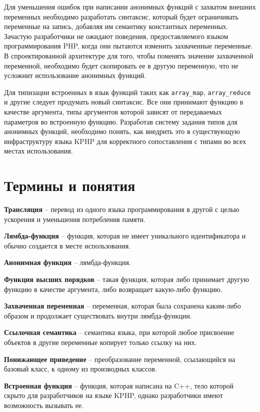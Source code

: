 Для уменьшения ошибок при написании анонимных функций с захватом внешних переменных необходимо разработать синтаксис, который будет ограничивать переменные на запись, добавляя им семантику константных переменных.
Зачастую разработчики не ожидают поведения, предоставляемого языком программирования PHP, когда они пытаются изменить захваченные переменные.
В спроектированной архитектуре для того, чтобы поменять значение захваченной переменной, необходимо будет скопировать ее в другую переменную, что не усложнит использование анонимных функций.

Для типизации встроенных в язык функций таких как \verb|array_map|, \verb|array_reduce| и другие следует продумать новый синтаксис.
Все они принимают функцию в качестве аргумента, типы аргументов которой зависят от передаваемых параметров во встроенную функцию.
Разработав систему задания типов для анонимных функций, необходимо понять, как внедрить это в существующую инфраструктуру языка KPHP для корректного сопоставления с типами во всех местах использования.

\section{Термины и понятия}
\textbf{Трансляция} -- перевод из одного языка программирования в другой с целью ускорения и уменьшения потребления памяти.

\textbf{Лямбда-функция} -- функция, которая не имеет уникального идентификатора и обычно создается в месте использования.

\textbf{Анонимная функция} -- лямбда-функция.

\textbf{Функция высших порядков} -- такая функция, которая либо принимает другую функцию в качестве аргумента, либо возвращает какую-либо функцию.

\textbf{Захваченная переменная} -- переменная, которая была сохранена каким-либо образом и продолжает существовать внутри лямбда-функции.

\textbf{Ссылочная семантика} -- семантика языка, при которой любое присвоение объектов в другие переменные копирует только ссылку на них.

\textbf{Понижающее приведение} -- преобразование переменной, ссылающийся на базовый класс, к одному из производных классов.

\textbf{Встроенная функция} -- функция, которая написана на C++, тело которой скрыто для разработчиков на языке KPHP, однако разработчики имеют возможность вызывать ее.

